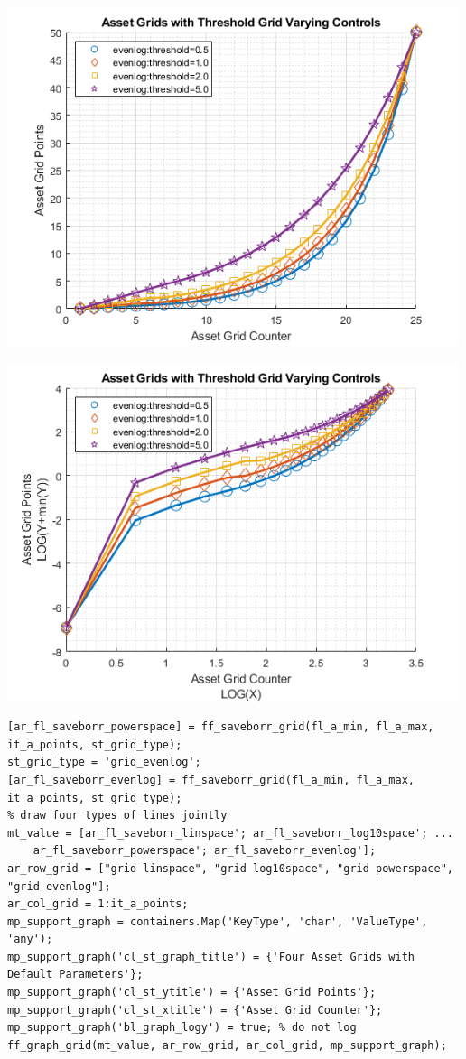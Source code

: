 \documentclass[
]{book}
\begin{document}
\includegraphics[width=5.20833in,height=\textheight]{img/fx_saveborr_grid_images/figure_6.png}

\includegraphics[width=5.20833in,height=\textheight]{img/fx_saveborr_grid_images/figure_7.png}

\begin{verbatim}
[ar_fl_saveborr_powerspace] = ff_saveborr_grid(fl_a_min, fl_a_max, it_a_points, st_grid_type);
st_grid_type = 'grid_evenlog';
[ar_fl_saveborr_evenlog] = ff_saveborr_grid(fl_a_min, fl_a_max, it_a_points, st_grid_type);
% draw four types of lines jointly
mt_value = [ar_fl_saveborr_linspace'; ar_fl_saveborr_log10space'; ...
    ar_fl_saveborr_powerspace'; ar_fl_saveborr_evenlog'];
ar_row_grid = ["grid linspace", "grid log10space", "grid powerspace", "grid evenlog"];
ar_col_grid = 1:it_a_points;
mp_support_graph = containers.Map('KeyType', 'char', 'ValueType', 'any');
mp_support_graph('cl_st_graph_title') = {'Four Asset Grids with Default Parameters'};
mp_support_graph('cl_st_ytitle') = {'Asset Grid Points'};
mp_support_graph('cl_st_xtitle') = {'Asset Grid Counter'};
mp_support_graph('bl_graph_logy') = true; % do not log
ff_graph_grid(mt_value, ar_row_grid, ar_col_grid, mp_support_graph);
\end{verbatim}
\end{document}
